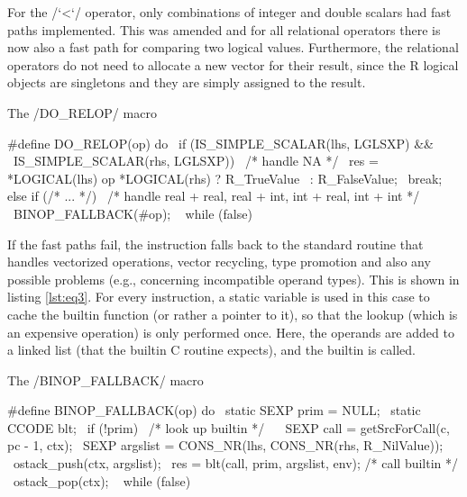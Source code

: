 For the \rinline/`<`/ operator, only combinations of integer and double scalars had fast paths implemented. This was amended and for all relational operators there is now also a fast path for comparing two logical values. Furthermore, the relational operators do not need to allocate a new vector for their result, since the R logical objects are singletons and they are simply assigned to the result.

\begin{listing}[htbp]
  \caption{\label{lst:eq2}The \cinline/DO_RELOP/ macro}
  \begin{ccode}
#define DO_RELOP(op) do {                                             \
    if (IS_SIMPLE_SCALAR(lhs, LGLSXP) &&                              \
        IS_SIMPLE_SCALAR(rhs, LGLSXP)) {                              \
        /* handle NA */                                               \
        res = *LOGICAL(lhs) op *LOGICAL(rhs) ? R_TrueValue            \
                                             : R_FalseValue;          \
        break;                                                        \
    } else if (/* ... */) {                                           \
        /* handle real + real, real + int, int + real, int + int */   \
    }                                                                 \
    BINOP_FALLBACK(#op);                                              \
} while (false)
  \end{ccode}
\end{listing}

If the fast paths fail, the instruction falls back to the standard routine that handles vectorized operations, vector recycling, type promotion and also any possible problems (e.g., concerning incompatible operand types). This is shown in listing \ref{lst:eq3}. For every instruction, a static variable is used in this case to cache the builtin function (or rather a pointer to it), so that the lookup (which is an expensive operation) is only performed once. Here, the operands are added to a linked list (that the builtin C routine expects), and the builtin is called.

\begin{listing}[htbp]
  \caption{\label{lst:eq3}The \cinline/BINOP_FALLBACK/ macro}
  \begin{ccode}
#define BINOP_FALLBACK(op) do {                                       \
    static SEXP prim = NULL;                                          \
    static CCODE blt;                                                 \
    if (!prim) {                                                      \
        /* look up builtin */                                         \
    }                                                                 \
    SEXP call = getSrcForCall(c, pc - 1, ctx);                        \
    SEXP argslist = CONS_NR(lhs, CONS_NR(rhs, R_NilValue));           \
    ostack_push(ctx, argslist);                                       \
    res = blt(call, prim, argslist, env);  /* call builtin */         \
    ostack_pop(ctx);                                                  \
} while (false)
  \end{ccode}
\end{listing}

